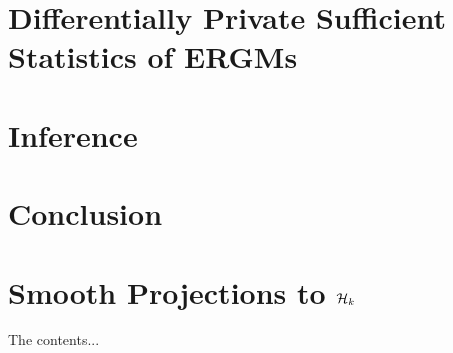 \documentclass[12pt]{report}
\begin{document}
	\chapter{Differentially Private Sufficient Statistics of ERGMs}\label{ch:dp_stats}
	
	
	
	
	\chapter{Inference}\label{inference}
	
	
	
	\chapter{Conclusion}\label{conclusion}
	
	
	\cleardoublepage
	
	\nocite{*}
	\printbibliography	
	
	
		\appendix
		\chapter{Smooth Projections to $\mathcal{H}_k$}\label{appendix_projections}
		The contents...
	
\end{document}
